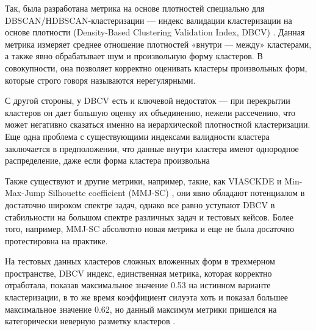 Так, была разработана метрика на основе плотностей специально для DBSCAN/HDBSCAN-кластеризации --- индекс валидации
кластеризации на основе плотности (Density-Based Clustering Validation Index, DBCV) \parencite{dbcv2014density}.
Данная метрика измеряет среднее отношение плотностей «внутри --- между» кластерами, а также явно обрабатывает
шум и произвольную форму кластеров. В совокупности, она позволяет корректно оценивать кластеры произвольных
форм, которые строго говоря называются нерегулярными.

С другой стороны, у DBCV есть и ключевой недостаток --- при перекрытии кластеров он дает большую оценку их
объединению, нежели рассечению, что может негативно сказаться именно на иерархической плотностной кластеризации.
Еще одна проблема с существующими индексами валидности кластера заключается в предположении, что данные внутри
кластера имеют однородное распределение, даже если форма кластера произвольна

Также существуют и другие метрики, например, такие, как VIASCKDE \parencite{viasckde2022} и Min-Max-Jump
Silhouette coefficient (MMJ-SC) \parencite{mmj2023liu, liu2024newindexclusteringevaluation},
они явно обладают потенциалом в достаточно широком спектре задач, однако все равно уступают DBCV в стабильности
на большом спектре различных задач и тестовых кейсов. Более того, например, MMJ-SC абсолютно новая метрика и еще
не была досаточно протестировна на практике.

На тестовых данных кластеров сложных вложенных форм в трехмерном пространстве, DBCV индекс, единственная метрика,
которая корректно отработала, показав максимальное значение 0.53 на истинном варианте кластеризации, в то же время
коэффициент силуэта хоть и показал большее максимальное значение 0.62, но данный максимум метрики пришелся
на категорически неверную разметку кластеров \parencite{liu2024newindexclusteringevaluation}.